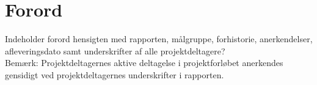 \chapter{Forord}
Indeholder forord hensigten med rapporten, målgruppe, forhistorie, anerkendelser, afleveringsdato samt underskrifter af alle projektdeltagere?\\
Bemærk: Projektdeltagernes aktive deltagelse i projektforløbet anerkendes gensidigt ved projektdeltagernes underskrifter i rapporten. 